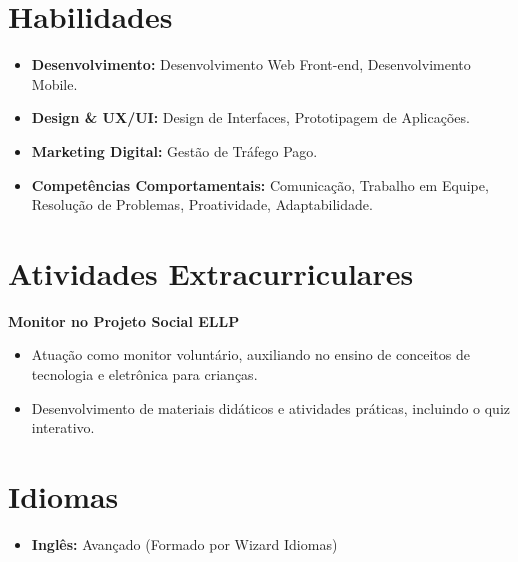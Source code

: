 \documentclass[10pt, a4paper]{article}
\begin{document}
\section*{Habilidades}
\begin{itemize}
    \item \textbf{Desenvolvimento:} Desenvolvimento Web Front-end, Desenvolvimento Mobile.
    \item \textbf{Design \& UX/UI:} Design de Interfaces, Prototipagem de Aplicações.
    \item \textbf{Marketing Digital:} Gestão de Tráfego Pago.
    \item \textbf{Competências Comportamentais:} Comunicação, Trabalho em Equipe, Resolução de Problemas, Proatividade, Adaptabilidade.
\end{itemize}


\section*{Atividades Extracurriculares}
\textbf{Monitor no Projeto Social ELLP}
\begin{itemize}
    \item Atuação como monitor voluntário, auxiliando no ensino de conceitos de tecnologia e eletrônica para crianças.
    \item Desenvolvimento de materiais didáticos e atividades práticas, incluindo o quiz interativo.
\end{itemize}


\section*{Idiomas}
\begin{itemize}
    \item \textbf{Inglês:} Avançado (Formado por Wizard Idiomas)
\end{itemize}
\end{document}
